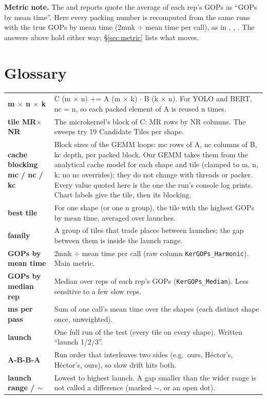 \noindent\textbf{Metric note.} The  and  reports quote the average of each rep's GOPs as ``GOPs by mean time''. Here every packing number is recomputed from the same runs with the true GOPs by mean time (2mnk $\div$ mean time per call), as in , , . The answers above hold either way; \S\ref{sec:metric} lists what moves.

\section*{Glossary}
{\small
\begin{tabularx}{\textwidth}{@{}>{\bfseries}p{3.6cm} X@{}}
\toprule
m $\times$ n $\times$ k & C (m $\times$ n) += A (m $\times$ k) $\cdot$ B (k $\times$ n). For YOLO and BERT, nc = n, so each packed element of A is reused n times. \\
tile MR$\times$NR & The microkernel's block of C: MR rows by NR columns. The sweeps try 19 Candidate Tiles per shape. \\
cache blocking mc / nc / kc & Block sizes of the GEMM loops: mc rows of A, nc columns of B, kc depth, per packed block. Our GEMM takes them from the analytical cache model for each shape and tile (clamped to m, n, k; no nc overrides); they do not change with threads or packer. Every value quoted here is the one the run's console log prints. Chart labels give the tile, then its blocking. \\
best tile & For one shape (or one n group), the tile with the highest GOPs by mean time, averaged over launches. \\
family & A group of tiles that trade places between launches; the gap between them is inside the launch range. \\
GOPs by mean time & 2mnk $\div$ mean time per call (raw column \texttt{KerGOPs\_Harmonic}). Main metric. \\
GOPs by median rep & Median over reps of each rep's GOPs (\texttt{KerGOPs\_Median}). Less sensitive to a few slow reps. \\
ms per pass & Sum of one call's mean time over the shapes (each distinct shape once, unweighted). \\
launch & One full run of the test (every tile on every shape). Written ``launch 1/2/3''. \\
A-B-B-A & Run order that interleaves two sides (e.g.\ ours, H\'ector's, H\'ector's, ours), so slow drift hits both. \\
launch range / $\sim$ & Lowest to highest launch. A gap smaller than the wider range is not called a difference (marked $\sim$, or an open dot). \\

\end{tabularx}}
